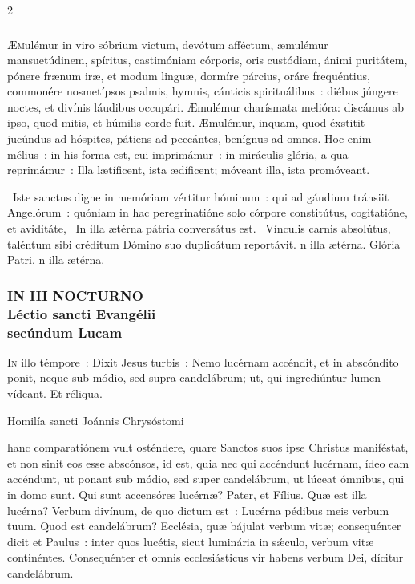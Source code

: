 \documentclass[9pt,twoside]{extarticle}
\begin{document}
\begin{multicols}{2}
\subsubsection*{\center \normalfont {}}
\lettrine{Æ}mulémur in viro sóbrium victum, devótum afféctum, æmulémur mansuetúdinem, spíritus, castimóniam córporis, oris custódiam, ánimi puritátem, pónere frænum iræ, et modum linguæ, dormíre párcius, oráre frequéntius, commonére nosmetípsos psalmis, hymnis, cánticis spirituálibus~: diébus júngere noctes, et divínis láudibus occupári. Æmulémur charísmata melióra: discámus ab ipso, quod mitis, et húmilis corde fuit. Æmulémur, inquam, quod éxstitit jucúndus ad hóspites, pátiens ad peccántes, benígnus ad omnes. Hoc enim mélius~: in his forma est, cui imprimámur~: in miráculis glória, a qua reprimámur~: Illa lætíficent, ista ædíficent; móveant illa, ista promóveant.

~Iste sanctus digne in memóriam vértitur hóminum~: qui ad gáudium tránsiit Angelórum~: quóniam in hac peregrinatióne solo córpore constitútus, cogitatióne, et aviditáte, \textred{*}~In illa ætérna pátria conversátus est. ~Vínculis carnis absolútus, taléntum sibi créditum Dómino suo duplicátum reportávit. n illa ætérna. Glória Patri. n illa ætérna.

\subsubsection*{\center \textsc{\small IN III NOCTURNO}\\ 
\normalfont Léctio sancti Evangélii\\ secúndum Lucam\\
}
\lettrine{I}n illo témpore~: Dixit Jesus turbis~: Nemo lucérnam accéndit, et in abscóndito ponit, neque sub módio, sed supra candelábrum; ut, qui ingrediúntur lumen vídeant. Et réliqua.

\begin{center}Homilía sancti Joánnis Chrysóstomi\\
\small {}\end{center}
 hanc comparatiónem vult osténdere, quare Sanctos suos ipse Christus maniféstat, et non sinit eos esse abscónsos, id est, quia nec qui accéndunt lucérnam, ídeo eam accéndunt, ut ponant sub módio, sed super candelábrum, ut lúceat ómnibus, qui in domo sunt. Qui sunt accensóres lucérnæ? Pater, et Fílius. Quæ est illa lucérna? Verbum divínum, de quo dictum est~: Lucérna pédibus meis verbum tuum. Quod est candelábrum? Ecclésia, quæ bájulat verbum vitæ; consequénter dicit et Paulus~: inter quos lucétis, sicut luminária in sǽculo, verbum vitæ continéntes. Consequénter et omnis ecclesiásticus vir habens verbum Dei, dícitur candelábrum.


\end{multicols}
\end{document}
